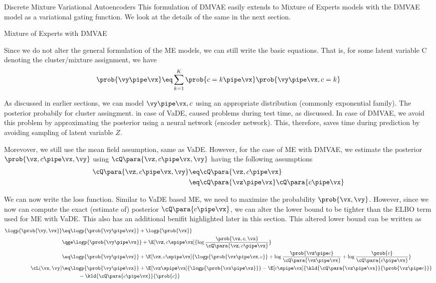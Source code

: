 \documentclass{article}
\begin{document}
\begin{psection}{Discrete Mixture Variational Autoencoders}
	This formulation of DMVAE easily extends to Mixture of Experts models with the DMVAE model as a variational gating function. We look at the details of the same in the next section.

\end{psection}

\begin{psection}{Mixture of Experts with DMVAE}

	Since we do not alter the general formulation of the ME models, we can still write the basic equations. That is, for some latent variable C denoting the cluster/mixture assignment, we have
	\begin{align*}
		\prob{\vy \pipe \vx} \eq \sum_{k = 1}^{K} \prob{c = k \pipe \vx} \prob{\vy \pipe \vx, c = k}
	\end{align*}

	As discussed in earlier sections, we can model $\vy \pipe \vx, c$ using an appropriate distribution (commonly exponential family). The posterior probabily for cluster assingment. in case of VaDE, caused problems during test time, as discussed. In case of DMVAE, we avoid this problem by approximating the posterior using a neural network (encoder network). This, therefore, saves time during prediction by avoiding sampling of latent variable $Z$.

	Morevover, we still use the mean field assumption, same as VaDE. However, for the case of ME with DMVAE, we estimate the posterior $\prob{\vz, c \pipe \vx, \vy}$ using $\cQ\para{\vz, c \pipe \vx, \vy}$ having the following assumptions
	\begin{align*}
		\cQ\para{\vz, c \pipe \vx, \vy} &\eq \cQ\para{\vz, c \pipe \vx} \\
		&\eq \cQ\para{\vz \pipe \vx} \cQ\para{c \pipe \vx}
	\end{align*}

	We can now write the loss function. Similar to VaDE based ME, we need to maximize the probability $\prob{\vx, \vy}$. However, since we now can compute the exact (estimate of) posterior $\cQ\para{c \pipe \vx}$, we can alter the lower bound to be tighter than the ELBO term used for ME with VaDE. This also has an additional benifit highlighted later in this section. This altered lower bound can be written as
	\begin{align*}
		\logp{\prob{\vy, \vx}} &\eq \logp{\prob{\vy \pipe \vx}} + \logp{\prob{\vx}} \\
		&\qge	\logp{\prob{\vy \pipe \vx}} + \E[\vz, c \spipe \vx]{\log{\frac{\prob{\vz, c, \vx}}{\cQ\para{\vz, c \pipe \vx}}}} \\
		&\eq	\logp{\prob{\vy \pipe \vx}} + \E[\vz, c \spipe \vx]{\logp{\prob{\vx \pipe \vz, c}} + \log{\frac{\prob{\vz \pipe c}}{\cQ\para{\vz \pipe \vx}}} + \log{\frac{\prob{c}}{\cQ\para{c \pipe \vx}}}} \\
		\cL(\vx, \vy)	&\eq	\logp{\prob{\vy \pipe \vx}} + \E[\vz \spipe \vx]{\logp{\prob{\vx \pipe \vz}}} - \E[c \spipe \vx]{\kld{\cQ\para{\vz \pipe \vx}}{\prob{\vz \pipe c}}} \\&\hspace{1.1cm}- \kld{\cQ\para{c \pipe \vx}}{\prob{c}}
	\end{align*}


\end{psection}
\end{document}

